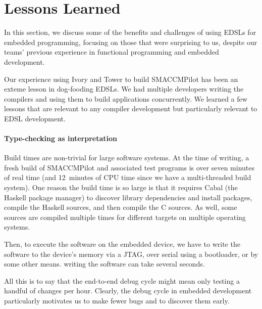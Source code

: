 \section{Lessons Learned}
\label{sec:thegood}

In this section, we discuss some of the benefits and challenges of
using EDSLs for embedded programming, focusing on those that were surprising to
us, despite our teams' previous experience in functional programming and
embedded development.

Our experience using Ivory and Tower to build SMACCMPilot has been an exteme
lesson in dog-fooding EDSLs.  We had multiple developers writing the compilers
and using them to build applications concurrently.  We learned a few lessons
that are relevant to any compiler development but particularly relevant to EDSL
development.

\paragraph{Type-checking as interpretation}
Build times are non-trivial for large software systems.  At the time of writing,
a fresh build of SMACCMPilot and associated test programs is over seven minutes
of real time (and 12~minutes of CPU time since we have a multi-threaded build
system).  One reason the build time is so large is that it requires Cabal (the
Haskell package manager) to discover library dependencies and install packages,
compile the Haskell sources, and then compile the C sources.  As well, some
sources are compiled multiple times for different targets on
multiple operating systems.

Then, to execute the software on the embedded device, we have to write the
software to the device's memory via a JTAG, over serial using a bootloader, or
by some other means.  writing the software can take several seconds.

All this is to say that the end-to-end debug cycle might mean only testing a
handful of changes per hour.  Clearly, the debug cycle in embedded development
particularly motivates us to make fewer bugs and to discover them early.



